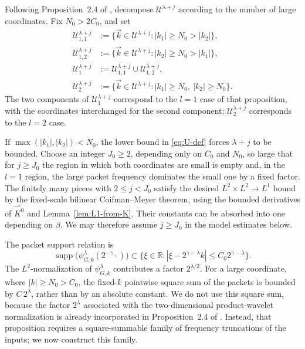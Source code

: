 \documentclass[11pt]{amsart}
\theoremstyle{remark}
\numberwithin{equation}{section}
\newcommand{\R}{\mathbb R}
\newcommand{\cU}{\mathcal U}
\newcommand{\supp}{\operatorname{supp}}
\begin{document}
	Following Proposition~2.4 of
	\cite{GrafakosHeHonzikPark2023}, decompose \(\cU^{\lambda+j}\) according to the
	number of large coordinates.
	Fix \(N_0>2C_0\), and set
	\begin{align*}
		\cU_{1,1}^{\lambda+j}
		&:=\{\vec k\in\cU^{\lambda+j}:|k_1|\ge N_0>|k_2|\},\\
		\cU_{1,2}^{\lambda+j}
		&:=\{\vec k\in\cU^{\lambda+j}:|k_2|\ge N_0>|k_1|\},\\
		\cU_1^{\lambda+j}&:=
		\cU_{1,1}^{\lambda+j}\cup\cU_{1,2}^{\lambda+j},\\
		\cU_2^{\lambda+j}
		&:=\{\vec k\in\cU^{\lambda+j}:|k_1|\ge N_0,\ |k_2|\ge N_0\}.
	\end{align*}
	The two components of \(\cU_1^{\lambda+j}\) correspond to the \(l=1\) case
	of that proposition, with the coordinates interchanged for the second
	component; \(\cU_2^{\lambda+j}\) corresponds to the \(l=2\) case.
	
	If \(\max(|k_1|,|k_2|)<N_0\), the lower bound in
	\eqref{eq:U-def} forces \(\lambda+j\) to be bounded. Choose
	an integer \(J_0\ge2\), depending only on \(C_0\) and \(N_0\), so large that
	for \(j\ge J_0\) the region in which both coordinates are small is empty and,
	in the \(l=1\) region,
	the large packet frequency dominates the small one by a fixed factor. The
	finitely many pieces with \(2\le j<J_0\) satisfy the desired
	\(L^2\times L^2\to L^1\) bound by the fixed-scale bilinear
	Coifman--Meyer theorem, using the bounded derivatives of
	\(\widehat{K^0}\) and Lemma~\ref{lem:L1-from-K}. Their constants can be
	absorbed into one depending on \(\beta\).  We may therefore assume
	\(j\ge J_0\) in the model estimates below.
	
	The packet support relation is
	\begin{equation}\label{eq:packet-support-gamma}
		\supp\bigl(\psi_{G,k}^\lambda(2^{-\gamma}\cdot)\bigr)
		\subset
		\bigl\{\xi\in\R:
		|\xi-2^{\gamma-\lambda}k|\le C_0 2^{\gamma-\lambda}\bigr\}.
	\end{equation}
	The \(L^2\)-normalization of \(\psi_{G,k}^\lambda\) contributes a factor
	\(2^{\lambda/2}\). For a large coordinate, where \(|k|\ge N_0>C_0\), the
	fixed-\(k\) pointwise square sum of the packets is bounded by \(C\,2^\lambda\),
	rather than by an absolute constant.  We do not use this square sum, because
	the factor \(2^\lambda\) associated with the two-dimensional product-wavelet
	normalization is already incorporated in Proposition~2.4 of
	\cite{GrafakosHeHonzikPark2023}.  Instead, that proposition requires a
	square-summable family of frequency truncations of the inputs; we now construct
	this family.
	
\end{document}
